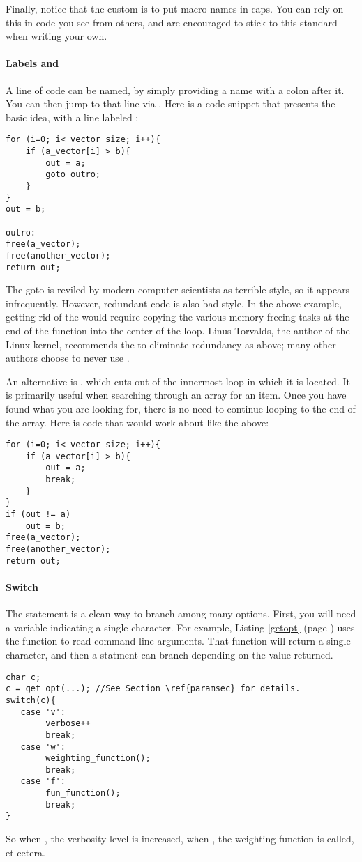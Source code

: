 Finally, notice that the custom is to put macro names in caps.  You can
rely on this in code you see from others, and are encouraged to stick
to this standard when writing your own.

\paragraph{Labels and } 
A line of code can be named, by simply providing a
name with a colon after it. You can then jump to that line via . Here is a code snippet that presents the basic idea, with a line labeled :
\begin{lstlisting}
for (i=0; i< vector_size; i++){
    if (a_vector[i] > b){
        out = a;
        goto outro;
    }
}
out = b;

outro:
free(a_vector);
free(another_vector);
return out;
\end{lstlisting}
The goto is reviled by modern computer scientists as terrible style, so
it appears infrequently. However, redundant code is also bad style. 
In the above example, getting rid of the  would require copying
the various memory-freeing tasks at the end of the function into the
center of the  loop.  Linus Torvalds,
the author of the Linux kernel, recommends the  to eliminate
redundancy as above; many other authors choose to never use .

An alternative is , which cuts out of the innermost loop in
which it is located. It is primarily useful when searching through an
array for an item. Once you have found what you are looking for, there
is no need to continue looping to the end of the array.
Here is code that would work about like the above:
\begin{lstlisting}
for (i=0; i< vector_size; i++){
    if (a_vector[i] > b){
        out = a;
        break;
    }
}
if (out != a)
    out = b;
free(a_vector);
free(another_vector);
return out;
\end{lstlisting}

\paragraph{Switch} The  statement is a
clean way to branch among many options. First, you will need a variable
indicating a single character. For example, Listing \ref{getopt} (page
\pageref{getopt}) uses the  function to read command line
arguments. That function will return a single character, and then a
 statment can branch depending on the value returned.
\lstset{texcl=true} %
\begin{lstlisting}
char c;
c = get_opt(...); //See Section \ref{paramsec} for details.
switch(c){
   case 'v':
        verbose++
        break;
   case 'w':    
        weighting_function();
        break;
   case 'f':      
        fun_function();
        break;
}
\end{lstlisting}
\lstset{texcl=false}
So when 
, the verbosity level is increased,
when , the weighting function is called, 
et cetera.

